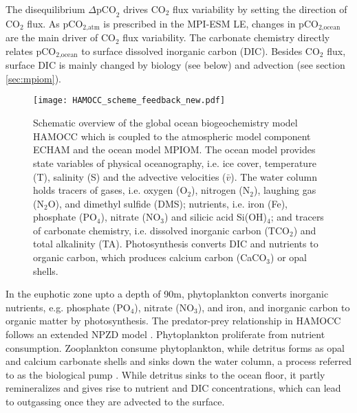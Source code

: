 The disequilibrium $\Delta \text{pCO}_\text{2}$ drives CO$_2$ flux variability by setting the direction of CO$_2$ flux. As pCO$_{2\text{,atm}}$ is prescribed in the \acs{MPI-ESM LE}, changes in pCO$_{2\text{,ocean}}$ are the main driver of CO$_2$ flux variability. The carbonate chemistry directly relates pCO$_{2\text{,ocean}}$ to surface dissolved inorganic carbon (\acs{DIC}). Besides CO$_2$ flux, surface \acs{DIC} is mainly changed by biology (see below) and advection (see section \ref{sec:mpiom}).\newline

\begin{figure}[h!]
	\centering
	\texttt{[image: HAMOCC\_scheme\_feedback\_new.pdf]}
	\caption{Schematic overview of the global ocean biogeochemistry model \acs{HAMOCC} \citep{Ilyina2013} which is coupled to the atmospheric model component \acs{ECHAM} and the ocean model \acs{MPIOM}. The ocean model provides state variables of physical oceanography, i.e. ice cover, temperature (T), salinity (S) and the advective velocities ($\bar{v}$).
	 The water column holds tracers of gases, i.e. oxygen (O$_2$), nitrogen (N$_2$), laughing gas (N$_2$O), and dimethyl sulfide (DMS); nutrients, i.e. iron (Fe), phosphate (PO$_4$), nitrate (NO$_3$) and silicic acid Si(OH)$_4$; and tracers of carbonate chemistry, i.e. dissolved inorganic carbon (TCO$_2$) and total alkalinity (TA). Photosynthesis converts \ac{DIC} and nutrients to organic carbon, which produces calcium carbon (CaCO$_3$) or opal shells.}
	\label{fig:HAMOCC}
\end{figure}

In the euphotic zone upto a depth of 90m, phytoplankton converts inorganic nutrients, e.g. phosphate (PO$_4$), nitrate (NO$_3$), and iron, and inorganic carbon to organic matter by photosynthesis. The predator-prey relationship in \acs{HAMOCC} follows an extended \acs{NPZD} model \citep{Six1996}. Phytoplankton proliferate from nutrient consumption.  Zooplankton consume phytoplankton, while detritus forms as opal and calcium carbonate shells and sinks down the water column, a process referred to as the biological pump \citep{VolkHoffert1985}. While detritus sinks to the ocean floor, it partly remineralizes and gives rise to nutrient and \acs{DIC} concentrations, which can lead to outgassing once they are advected to the surface. 

